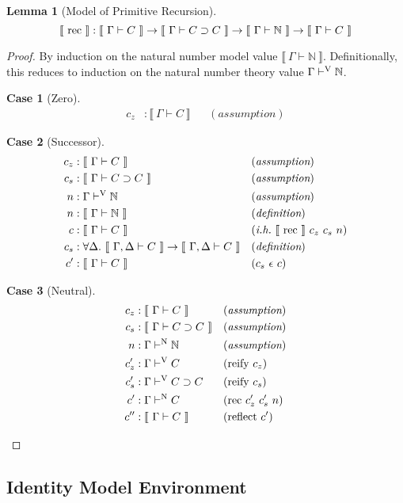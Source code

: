 \documentclass[preprint,nonatbib]{sigplanconf}
\numberwithin{subdefin}{defin}
\theoremstyle{definition}
\numberwithin{subtheorem}{theorem}
\numberwithin{sublemma}{theorem}
\numberwithin{corollary}{theorem}
\numberwithin{case}{theorem}
\numberwithin{slcase}{sublemma}
\newtheorem{scase}{Case}
\numberwithin{scase}{subtheorem}
\newtheorem{lemma}{Lemma}
\numberwithin{lcase}{lemma}
\def\arr{\supset}
\def\marr{\rightarrow}
\def\nat{\mathbb{N}}
\def\emp{\epsilon}
\def\bydef{(\textit{definition})}
\def\byass{(\textit{assumption})}
\newcommand{\ih}[1]{(\textit{i.h.}~ #1)}
\newcommand{\by}[1]{(#1)}
\newcommand{\turn}[1]{\vdash^\con{#1}}
\newcommand{\all}[1]{\forall#1.~}
\newcommand{\el}[1]{\llbracket ~ #1 ~ \rrbracket}
\newcommand{\con}[1]{\textmd{#1}}
\newcommand{\fun}[1]{\textmd{#1}}
\newcommand{\typm}[1]{\el{\Gamma \vdash #1}}
\newcommand{\gdtypm}[1]{\el{\Gamma, \Delta \vdash #1}}
\newcommand{\typv}[1]{\Gamma \turn{V} #1}
\newcommand{\typn}[1]{\Gamma \turn{N} #1}
\begin{document}
\begin{lemma}[Model of Primitive Recursion]
\label{lem:mod:rec}
$$
\el{\fun{rec}} : \typm{C} \marr \typm{C \arr C} \marr \typm{\nat} \marr \typm{C}
$$

\begin{proof}

By induction on the natural number model value $\typm{\nat}$.
Definitionally, this reduces to induction on the natural number theory
value $\typv{\nat}$.

\begin{scase}[Zero]
\begin{align*}
c_z  &: \typm{C} && \byass
\end{align*}
\end{scase}

\begin{scase}[Successor]
\begin{align*}
c_z  &: \typm{C} && \byass\\
c_s  &: \typm{C \arr C} && \byass\\
n    &: \typv{\nat} && \byass\\
n    &: \typm{\nat} && \bydef\\
c    &: \typm{C} && \ih{\el{\fun{rec}}~c_z~c_s~n}\\
c_s  &: \all{\Delta} \gdtypm{C} \marr \gdtypm{C} && \bydef\\
c'   &: \typm{C} && \by{c_s~\emp~c}
\end{align*}
\end{scase}

\begin{scase}[Neutral]
\begin{align*}
c_z  &: \typm{C} && \byass\\
c_s  &: \typm{C \arr C} && \byass\\
n    &: \typn{\nat} && \byass\\
c_z' &: \typv{C} && \by{\fun{reify}~c_z}\\
c_s' &: \typv{C \arr C} && \by{\fun{reify}~c_s}\\
c'   &: \typn{C} && \by{\fun{rec}~c_z'~c_s'~n}\\
c''  &: \typm{C} && \by{\fun{reflect}~c'}
\end{align*}
\end{scase}

\end{proof}

\end{lemma}

\subsection{Identity Model Environment}
\end{document}
